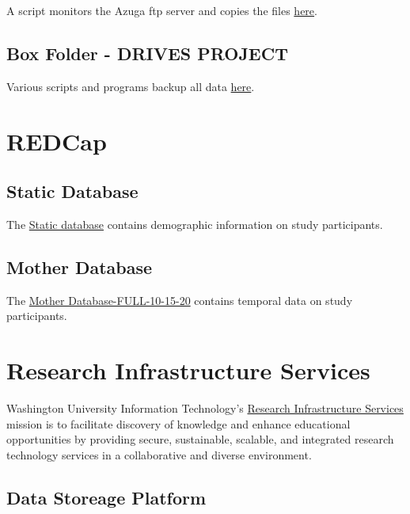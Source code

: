 \documentclass[
]{book}
\begin{document}
A script monitors the Azuga ftp server and copies the files \href{https://wustl.app.box.com/folder/51542575135}{here}.

\hypertarget{box-folder---drives-project}{%
\subsection{Box Folder - DRIVES PROJECT}\label{box-folder---drives-project}}

Various scripts and programs backup all data \href{https://wustl.app.box.com/folder/144057580030}{here}.

\hypertarget{redcap}{%
\section{REDCap}\label{redcap}}

\hypertarget{static-database}{%
\subsection{Static Database}\label{static-database}}

The \href{https://redcap.wustl.edu/redcap/redcap_v10.6.28/index.php?pid=7842}{Static database} contains demographic information on study participants.

\hypertarget{mother-database}{%
\subsection{Mother Database}\label{mother-database}}

The \href{https://redcap.wustl.edu/redcap/redcap_v10.6.28/index.php?pid=6785}{Mother Database-FULL-10-15-20} contains temporal data on study participants.

\hypertarget{research-infrastructure-services}{%
\section{Research Infrastructure Services}\label{research-infrastructure-services}}

Washington University Information Technology's \href{https://ris.wustl.edu/}{Research Infrastructure Services} mission is to facilitate discovery of knowledge and enhance educational opportunities by providing secure, sustainable, scalable, and integrated research technology services in a collaborative and diverse environment.

\hypertarget{data-storeage-platform}{%
\subsection{Data Storeage Platform}\label{data-storeage-platform}}
\end{document}
